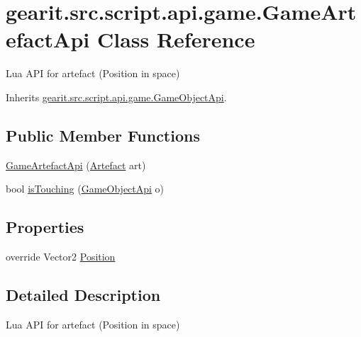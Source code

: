 \hypertarget{classgearit_1_1src_1_1script_1_1api_1_1game_1_1_game_artefact_api}{\section{gearit.\+src.\+script.\+api.\+game.\+Game\+Artefact\+Api Class Reference}
\label{classgearit_1_1src_1_1script_1_1api_1_1game_1_1_game_artefact_api}
}


Lua A\+P\+I for artefact (Position in space)  




Inherits \hyperlink{classgearit_1_1src_1_1script_1_1api_1_1game_1_1_game_object_api}{gearit.\+src.\+script.\+api.\+game.\+Game\+Object\+Api}.

\subsection*{Public Member Functions}
\begin{DoxyCompactItemize}
\item 
\hyperlink{classgearit_1_1src_1_1script_1_1api_1_1game_1_1_game_artefact_api_a44e02991a82ae53faad854a00d26b918}{Game\+Artefact\+Api} (\hyperlink{classgearit_1_1src_1_1map_1_1_artefact}{Artefact} art)
\item 
bool \hyperlink{classgearit_1_1src_1_1script_1_1api_1_1game_1_1_game_artefact_api_a586909e226188dfc9cd74127a0f81bd6}{is\+Touching} (\hyperlink{classgearit_1_1src_1_1script_1_1api_1_1game_1_1_game_object_api}{Game\+Object\+Api} o)
\end{DoxyCompactItemize}
\subsection*{Properties}
\begin{DoxyCompactItemize}
\item 
override Vector2 \hyperlink{classgearit_1_1src_1_1script_1_1api_1_1game_1_1_game_artefact_api_a78d9df2ac887cbd9cdddee1435348411}{Position}
\end{DoxyCompactItemize}


\subsection{Detailed Description}
Lua A\+P\+I for artefact (Position in space) 



